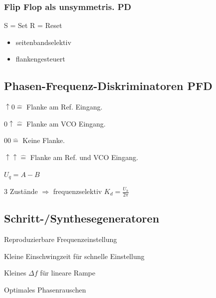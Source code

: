 \subsubsection{Flip Flop als unsymmetris. PD}


S = Set 
R = Reset 




\begin{itemize}
    \item seitenbandselektiv
    \item flankengesteuert
\end{itemize}


\subsection{Phasen-Frequenz-Diskriminatoren PFD}



\begin{pitemize}
    \item $\uparrow 0 \hat{=}$ Flanke am Ref. Eingang.
    \item $0 \uparrow \hat{=}$ Flanke am VCO Eingang.
    \item $00 \hat{=}$ Keine Flanke.
    \item $\uparrow \uparrow \hat{=}$ Flanke am Ref. und VCO Eingang.
\end{pitemize}

$U_q = A-B$

3 Zustände $\Rightarrow$ frequenzselektiv
$K_d = \frac{U_h}{2 \pi}$

\subsection{Schritt-/Synthesegeneratoren}


\begin{pitemize}
    \item Reproduzierbare Frequenzeinstellung
    \item Kleine Einschwingzeit für schnelle Einstellung
    \item Kleines $\Delta f$ für lineare Rampe
    \item Optimales Phasenrauschen
\end{pitemize}


